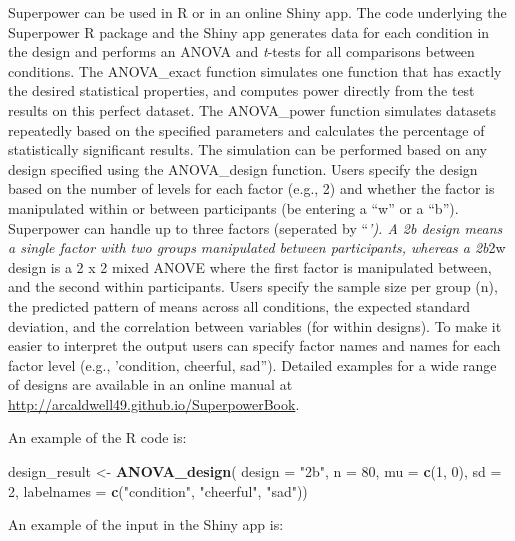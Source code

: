 \documentclass[
  ,man,floatsintext]{apa6}
\newenvironment{Shaded}{\begin{snugshade}}{\end{snugshade}}
\newcommand{\DataTypeTok}[1]{\textcolor[rgb]{0.13,0.29,0.53}{#1}}
\newcommand{\DecValTok}[1]{\textcolor[rgb]{0.00,0.00,0.81}{#1}}
\newcommand{\KeywordTok}[1]{\textcolor[rgb]{0.13,0.29,0.53}{\textbf{#1}}}
\newcommand{\NormalTok}[1]{#1}
\newcommand{\StringTok}[1]{\textcolor[rgb]{0.31,0.60,0.02}{#1}}
\begin{document}
Superpower can be used in R or in an online Shiny app.
The code underlying the Superpower R package and the Shiny app generates data for each condition in the design and performs an ANOVA and \emph{t}-tests for all comparisons between conditions.
The ANOVA\_exact function simulates one function that has exactly the desired statistical properties, and computes power directly from the test results on this perfect dataset.
The ANOVA\_power function simulates datasets repeatedly based on the specified parameters and calculates the percentage of statistically significant results.
The simulation can be performed based on any design specified using the ANOVA\_design function.
Users specify the design based on the number of levels for each factor (e.g., 2) and whether the factor is manipulated within or between participants (be entering a \enquote{w} or a \enquote{b}).
Superpower can handle up to three factors (seperated by \enquote{\emph{').
A 2b design means a single factor with two groups manipulated between participants, whereas a 2b}2w design is a 2 x 2 mixed ANOVE where the first factor is manipulated between, and the second within participants.
Users specify the sample size per group (n), the predicted pattern of means across all conditions, the expected standard deviation, and the correlation between variables (for within designs).
To make it easier to interpret the output users can specify factor names and names for each factor level (e.g., 'condition, cheerful, sad}).
Detailed examples for a wide range of designs are available in an online manual at \url{http://arcaldwell49.github.io/SuperpowerBook}.

An example of the R code is:

\begin{Shaded}
\begin{Highlighting}[]
\NormalTok{design_result <-}\StringTok{ }\KeywordTok{ANOVA_design}\NormalTok{(}
  \DataTypeTok{design =} \StringTok{"2b"}\NormalTok{, }
  \DataTypeTok{n =} \DecValTok{80}\NormalTok{,}
  \DataTypeTok{mu =} \KeywordTok{c}\NormalTok{(}\DecValTok{1}\NormalTok{, }\DecValTok{0}\NormalTok{), }
  \DataTypeTok{sd =} \DecValTok{2}\NormalTok{,}
  \DataTypeTok{labelnames =} \KeywordTok{c}\NormalTok{(}\StringTok{"condition"}\NormalTok{, }\StringTok{"cheerful"}\NormalTok{, }\StringTok{"sad"}\NormalTok{))}
\end{Highlighting}
\end{Shaded}

An example of the input in the Shiny app is:
\end{document}
